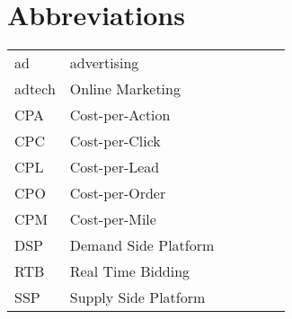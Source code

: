 \chapter*{Abbreviations}

\begin{flushleft}
\begin{tabular}{l p{0.8\linewidth}}
ad    & advertising\\
adtech   & Online Marketing\\
CPA   & Cost-per-Action\\
CPC   & Cost-per-Click\\
CPL   & Cost-per-Lead\\
CPO   & Cost-per-Order\\
CPM   & Cost-per-Mile\\
DSP   & Demand Side Platform\\
RTB   & Real Time Bidding\\
SSP   & Supply Side Platform\\
\end{tabular}
\end{flushleft}

